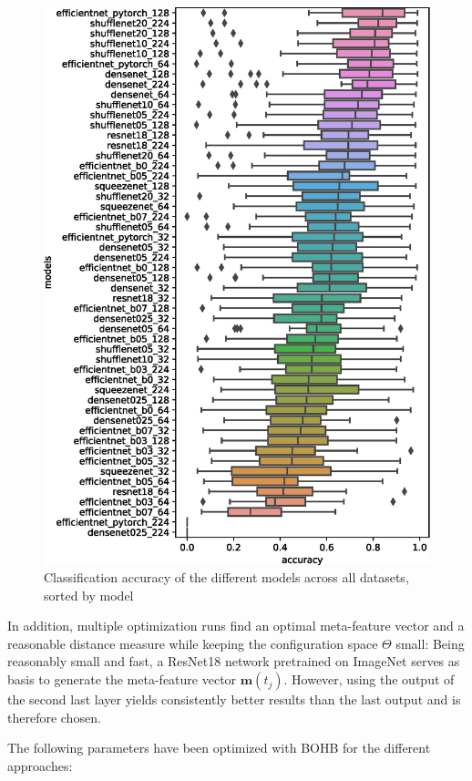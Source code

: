 \documentclass{article}
\begin{document}
%
\begin{figure}[htb]
\begin{center}
 	\includegraphics[width=0.95\linewidth]{../figures/rank_results.eps} 
\end{center}
\caption{Classification accuracy of the different models across all datasets, sorted by model}
\label{fig:rank_results}
\end{figure} 
%
In addition, multiple optimization runs find an optimal meta-feature vector and a reasonable distance measure while keeping the configuration space $\Theta$ small: Being reasonably small and fast, a ResNet18 network pretrained on ImageNet serves as basis to generate the meta-feature vector $\mathbf{m}(t_j)$. However, using the output of the second last layer yields consistently better results than the last output and is therefore chosen.

The following parameters have been optimized with BOHB for the different approaches: 
\end{document}
